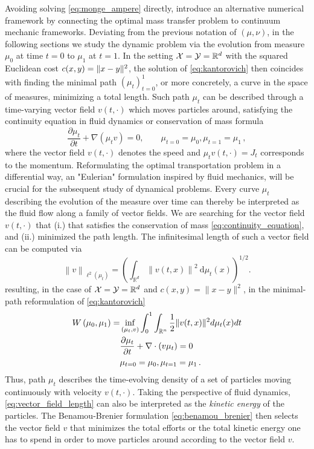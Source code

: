 Avoiding solving \eqref{eq:monge_ampere} directly, \citet{benamou2000computational} introduce an alternative numerical framework by connecting the optimal mass transfer problem to continuum mechanic frameworks.
Deviating from the previous notation of $(\mu, \nu)$, in the following sections we study the dynamic problem via the evolution from measure $\mu_0$ at time $t=0$ to $\mu_1$ at $t=1$. 
In the setting ${\mathcal{X}} = {\mathcal{Y}} = \mathbb{R}^d$ with the squared Euclidean cost $c(x, y) = \lVert x-y\rVert^2$, the solution of \eqref{eq:kantorovich} then coincides with finding the minimal path $(\mu_t)_{t=0}^1$, or more concretely, a curve in the space of measures, minimizing a total length.  
Such path $\mu_t$ can be described through a time-varying vector field $v(t, \cdot)$ which moves particles around, satisfying the continuity equation in fluid dynamics or conservation of mass formula
\begin{equation} \label{eq:continuity_equation}
	\frac{\partial \mu_t}{\partial t}+\nabla\left(\mu_t v\right)= 0, \qquad \mu_{t=0}=\mu_0, \mu_{t=1}=\mu_1\,,
\end{equation}
where the vector field $v(t, \cdot)$ denotes the speed and $\mu_t v(t, \cdot) = J_t$ corresponds to the momentum.
Reformulating the optimal transportation problem in a differential way, an "Eulerian" formulation inspired by fluid mechanics, will be crucial for the subsequent study of dynamical problems.
Every curve $\mu_t$ describing the evolution of the measure over time can thereby be interpreted as the fluid flow along a family of vector fields. We are searching for the vector field $v(t, \cdot)$ that (i.) that satisfies the conservation of mass \eqref{eq:continuity_equation}, and (ii.) minimized the path length.
The infinitesimal length of such a vector field can be computed via 
\begin{equation} \label{eq:vector_field_length}
	\left\|v\right\|_{\ell^2\left(\mu_t\right)}=\left(\int_{\mathbb{R}^d}\left\|v(t, x)\right\|^2 \mathrm{~d} \mu_t(x)\right)^{1 / 2}.
\end{equation}
resulting, in the case of ${\mathcal{X}} = {\mathcal{Y}} = \mathbb{R}^d$ and $c(x, y)=\|x-y\|^2$, in the minimal-path reformulation of \eqref{eq:kantorovich}
\begin{align}  \label{eq:benamou_brenier}
	W\left(\mu_0, \mu_1\right)=& \inf _{(\mu_t, v)} \int_0^1 \int_{\mathbb{R}^n}\frac{1}{2}\lVert v(t, x)\rVert^2 d\mu_t(x) d t \\
	& \nonumber \frac{\partial \mu_t}{\partial t}+\nabla \cdot(v \mu_t)=0 \\
	& \nonumber \mu_{t=0}=\mu_0, \mu_{t=1}=\mu_1\, .
\end{align}
Thus, path $\mu_t$ describes the time-evolving density of a set of particles moving continuously with velocity $v(t, \cdot)$.
Taking the perspective of fluid dynamics, \eqref{eq:vector_field_length} can also be interpreted as the \emph{kinetic energy} of the particles.
The Benamou-Brenier formulation \eqref{eq:benamou_brenier} then selects the vector field $v$ that minimizes the total efforts or the total kinetic energy one has to spend in order to move particles around according to the vector field $v$. \\


